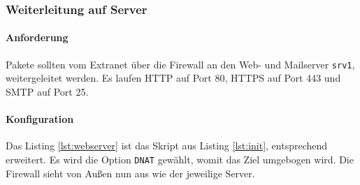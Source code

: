\subsubsection{Weiterleitung auf Server}

\paragraph{Anforderung} Pakete sollten vom Extranet über die Firewall an
den Web- und Mailserver {\tt srv1}, weitergeleitet werden.
Es laufen HTTP auf Port 80, HTTPS auf Port 443 und SMTP auf Port 25.

\paragraph{Konfiguration} Das Listing \ref{lst:webserver} ist das Skript
aus Listing \ref{lst:init}, entsprechend erweitert.
Es wird die Option {\tt DNAT} gewählt, womit das Ziel umgebogen wird.
Die Firewall sieht von Außen nun aus wie der jeweilige Server.

